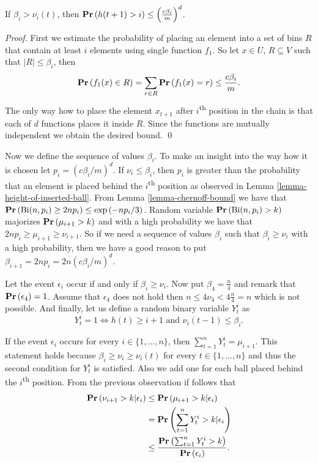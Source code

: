 \begin{lemma}
\label{lemma-height-of-inserted-ball}
If $\beta_i > \nu_i(t)$, then $\mathbf{Pr}\left(h(t + 1) > i\right) \leq \left(\frac{c\beta_i}{m}\right) ^ d$.
\end{lemma}
\begin{proof}
First we estimate the probability of placing an element into a set of bins $R$ that contain at least $i$ elements using single function $f_1$. So let $x \in U$, $R \subseteq V$ such that $|R| \leq \beta_i$, then $$\mathbf{Pr}\left(f_1(x) \in R\right) = \displaystyle\sum_{r \in R} \mathbf{Pr}\left(f_1(x) = r\right) \leq \frac{c\beta_i}{m}.$$
The only way how to place the element $x_{t + 1}$ after $i$\textsuperscript{th} position in the chain is that each of $d$ functions places it inside $R$. Since the functions are mutually independent we obtain the desired bound.
\qed
\end{proof}

Now we define the sequence of values $\beta_i$. To make an insight into the way how it is chosen let $p_i = \left({c\beta_i}/{m}\right) ^ d$. If $\nu_i \leq \beta_i$, then $p_i$ is greater than the probability that an element is placed behind the $i$\textsuperscript{th} position as observed in Lemma \ref{lemma-height-of-inserted-ball}. From Lemma \ref{lemma-chernoff-bound} we have that $\mathbf{Pr}\left(\mathrm{Bi}(n, p_i) \geq 2np_i\right) \leq \exp\left({-np_i}/{3}\right)$. Random variable $\mathbf{Pr}\left(\mathrm{Bi}(n, p_i) > k\right)$ majorizes $\mathbf{Pr}\left(\mu_{i + 1} > k\right)$ and with a high probability we have that $2np_i \geq \mu_{i + 1} \geq \nu_{i + 1}$. So if we need a sequence of values $\beta_i$ such that $\beta_i \geq \nu_{i}$ with a high probability, then we have a good reason to put $\beta_{i + 1} = 2np_i = 2n\left({c\beta_i}/{m}\right) ^ d$.

Let the event $\epsilon_i$ occur if and only if $\beta_i \geq \nu_i$. Now put $\beta_4 = \frac{n}{4}$ and remark that $\mathbf{Pr}\left(\epsilon_4\right) = 1$. Assume that $\epsilon_4$ does not hold then $n \leq 4 \nu_4 < 4 \frac{n}{4} = n$ which is not possible. And finally, let us define a random binary variable $Y_t^i$ as $$Y_t^i = 1 \Leftrightarrow h(t) \geq i + 1 \mbox{ and } \nu_i(t - 1) \leq \beta_i \textit{.}$$

If the event $\epsilon_i$ occurs for every $i \in \{1, \dots, n\}$, then $\sum_{t = 1}^{n} Y_t^i = \mu_{i + 1}$. This statement holds because $\beta_i \geq \nu_i \geq \nu_i(t)$ for every $t \in \{1, \dots, n\}$ and thus the second condition for $Y_t^i$ is satisfied. Also we add one for each ball placed behind the $i$\textsuperscript{th} position. 
From the previous observation if follows that
\[
\begin{split}
\mathbf{Pr}\left(\nu_{i + 1} > k | \epsilon_i\right) 
	& \leq \mathbf{Pr}\left(\mu_{i + 1} > k | \epsilon_i\right) \\
	& = \mathbf{Pr}\left(\displaystyle\sum_{t = 1}^{n} Y_t^{i} > k | \epsilon_i\right) \\
	& \leq \frac{\mathbf{Pr}\left(\sum_{t = 1}^{n} Y_t^{i} > k\right)}{\mathbf{Pr}\left(\epsilon_i\right)}. \\
\end{split}
\]

